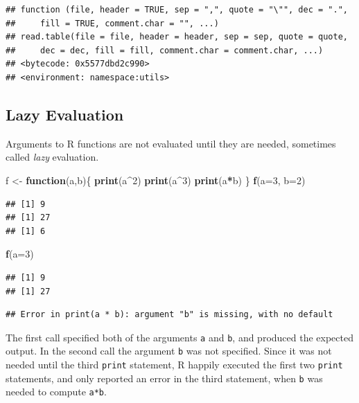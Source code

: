 \documentclass[
]{krantz}
\newenvironment{Shaded}{\begin{snugshade}}{\end{snugshade}}
\newcommand{\ControlFlowTok}[1]{\textcolor[rgb]{0.13,0.29,0.53}{\textbf{#1}}}
\newcommand{\DataTypeTok}[1]{\textcolor[rgb]{0.13,0.29,0.53}{#1}}
\newcommand{\DecValTok}[1]{\textcolor[rgb]{0.00,0.00,0.81}{#1}}
\newcommand{\KeywordTok}[1]{\textcolor[rgb]{0.13,0.29,0.53}{\textbf{#1}}}
\newcommand{\NormalTok}[1]{#1}
\newcommand{\OperatorTok}[1]{\textcolor[rgb]{0.81,0.36,0.00}{\textbf{#1}}}
\newcommand{\StringTok}[1]{\textcolor[rgb]{0.31,0.60,0.02}{#1}}
\begin{document}
\begin{verbatim}
## function (file, header = TRUE, sep = ",", quote = "\"", dec = ".", 
##     fill = TRUE, comment.char = "", ...) 
## read.table(file = file, header = header, sep = sep, quote = quote, 
##     dec = dec, fill = fill, comment.char = comment.char, ...)
## <bytecode: 0x5577dbd2c990>
## <environment: namespace:utils>
\end{verbatim}

\hypertarget{lazy-evaluation}{%
\subsection{Lazy Evaluation}\label{lazy-evaluation}}

Arguments to R functions are not evaluated until they are needed, sometimes called \emph{lazy} evaluation.

\begin{Shaded}
\begin{Highlighting}[]
\NormalTok{f \textless{}{-}}\StringTok{ }\ControlFlowTok{function}\NormalTok{(a,b)\{}
    \KeywordTok{print}\NormalTok{(a}\OperatorTok{\^{}}\DecValTok{2}\NormalTok{)}
    \KeywordTok{print}\NormalTok{(a}\OperatorTok{\^{}}\DecValTok{3}\NormalTok{)}
    \KeywordTok{print}\NormalTok{(a}\OperatorTok{*}\NormalTok{b)}
\NormalTok{\}}
\KeywordTok{f}\NormalTok{(}\DataTypeTok{a=}\DecValTok{3}\NormalTok{, }\DataTypeTok{b=}\DecValTok{2}\NormalTok{)}
\end{Highlighting}
\end{Shaded}

\begin{verbatim}
## [1] 9
## [1] 27
## [1] 6
\end{verbatim}

\begin{Shaded}
\begin{Highlighting}[]
\KeywordTok{f}\NormalTok{(}\DataTypeTok{a=}\DecValTok{3}\NormalTok{)}
\end{Highlighting}
\end{Shaded}

\begin{verbatim}
## [1] 9
## [1] 27
\end{verbatim}

\begin{verbatim}
## Error in print(a * b): argument "b" is missing, with no default
\end{verbatim}

The first call specified both of the arguments \texttt{a} and \texttt{b}, and produced the expected output. In the second call the argument \texttt{b} was not specified. Since it was not needed until the third \texttt{print} statement, R happily executed the first two \texttt{print} statements, and only reported an error in the third statement, when \texttt{b} was needed to compute \texttt{a*b}.
\end{document}
